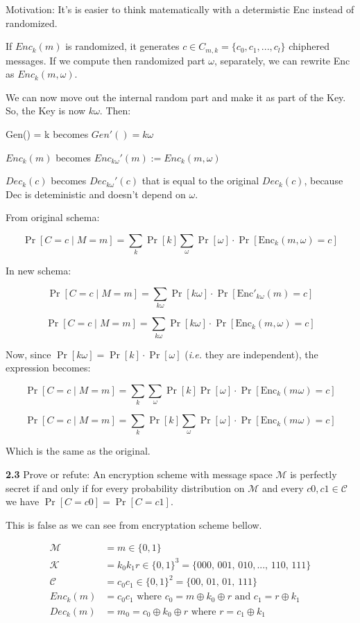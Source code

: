 Motivation: It's is easier to think matematically with a determistic Enc instead of randomized.

If $Enc_k(m)$ is randomized, it generates $c \in C_{m, k} = \{c_0, c_1, ..., c_l\}$ chiphered messages. If we compute then randomized part $\omega$, separately, we can rewrite Enc as  $Enc_k(m, \omega)$.

We can now move out the internal random part and make it as part of the Key. So, the Key is now $k\omega$. Then:

Gen() = k becomes $Gen'() = k\omega$

$Enc_k(m)$ becomes $Enc_{k\omega}'(m) := Enc_k(m, \omega)$

$Dec_k(c)$ becomes  $Dec_{k\omega}'(c)$ that is equal to the original $Dec_k(c)$, because Dec is deteministic and doesn't depend on $\omega$.

From original schema:

\[
\Pr[C = c \mid M = m] = \sum_{k} \Pr[k]  \sum_{\omega} \Pr[\omega] \cdot \Pr[\text{Enc}_k(m, \omega) = c]
\]

In new schema:

\[
\Pr[C = c \mid M = m] = \sum_{k\omega} \Pr[k\omega] \cdot \Pr[\text{Enc}'_{k\omega}(m) = c]
\]

\[
\Pr[C = c \mid M = m] = \sum_{k\omega} \Pr[k\omega] \cdot \Pr[\text{Enc}_k(m, \omega) = c]
\]

Now, since  $\Pr[k\omega]=\Pr[k]\cdot\Pr[\omega]$ (\textit{i.e.} they are independent), the expression becomes:

\[
\Pr[C = c \mid M = m] = \sum_{k} \sum_{\omega} \Pr[k]  \Pr[\omega] \cdot \Pr[\text{Enc}_k(m\omega) = c]
\]

\[
\Pr[C = c \mid M = m] = \sum_{k} \Pr[k] \sum_{\omega} \Pr[\omega] \cdot \Pr[\text{Enc}_k(m\omega) = c]
\]

Which is the same as the original.

\vspace{1em}
\noindent
\textbf{2.3} \hspace{1em} Prove or refute: An encryption scheme with message space $\mathcal{M}$ is perfectly secret if and only if for every probability distribution on $\mathcal{M}$ and every $c0,c1 \in \mathcal{C}$ we have $\Pr[C= c0] = \Pr[C= c1]$.
\vspace{1em}

This is false as we can see from encryptation scheme bellow.

\begin{align*}
	\mathcal{M} &= m \in \{0,1\} \\
	\mathcal{K} &= k_0k_1r \in \{0,1\}^3 = \{000,\,001,\,010,...,\,110,\,111\} \\
	\mathcal{C} &=  c_0c_1 \in \{0,1\}^2 = \{00,\,01,\,01,\,111\} \\
	Enc_k(m) &=  c_0c_1 \text{ where } c_0 = m \oplus k_0 \oplus r \text{ and } c_1 = r \oplus k_1 \\
    Dec_k(m) &= m_0 = c_0 \oplus k_0 \oplus r \text{ where } r = c_1 \oplus k_1 \\
\end{align*}

